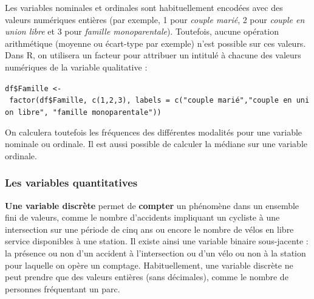 \documentclass[
  11pt,
  french,
]{book}
\makeatletter
\newenvironment{kframev}{%
\medskip{}
\setlength{\fboxsep}{.8em}
 \def\at@end@of@kframev{}%
 \ifinner\ifhmode%
  \def\at@end@of@kframev{\end{minipage}}%
  \begin{minipage}{\columnwidth}%
 \fi\fi%
 \def\FrameCommand##1{\hskip\@totalleftmargin \hskip-\fboxsep
 \colorbox{shadebluecolor}{##1}\hskip-\fboxsep
     \hskip-\linewidth \hskip-\@totalleftmargin \hskip\columnwidth}%
 \MakeFramed {\advance\hsize-\width
   \@totalleftmargin\z@ \linewidth\hsize
   \@setminipage}}%
 {\par\unskip\endMakeFramed%
 \at@end@of@kframev}
\newenvironment{rmdblock}[1]
  {
  \begin{itemize}
  \renewcommand{\labelitemi}{
    \raisebox{-.7\height}[0pt][0pt]{
      {\setkeys{Gin}{width=3em,keepaspectratio}\texttt{[image: images/\#1]}}
    }
  }
  \setlength{\fboxsep}{1em}
  \begin{kframev}
  \small
  \item
  }
  {
  \end{kframev}
  \end{itemize}
  }
\newenvironment{bloc_attention}
  {\begin{rmdblock}{attention}}
  {\end{rmdblock}}
\makeatother
\begin{document}
\begin{bloc_attention}

Les variables nominales et ordinales sont habituellement encodées avec des valeurs numériques entières (par exemple, 1 pour \emph{couple marié}, 2 pour \emph{couple en union libre} et 3 pour \emph{famille monoparentale}). Toutefois, aucune opération arithmétique (moyenne ou écart-type par exemple) n'est possible sur ces valeurs. Dans R, on utilisera un facteur pour attribuer un intitulé à chacune des valeurs numériques de la variable qualitative :

\texttt{df\$Famille\ \textless{}-\ factor(df\$Famille,\ c(1,2,3),\ labels\ =\ c("couple\ marié","couple\ en\ union\ libre",\ "famille\ monoparentale"))}

On calculera toutefois les fréquences des différentes modalités pour une variable nominale ou ordinale. Il est aussi possible de calculer la médiane sur une variable ordinale.

\end{bloc_attention}

\hypertarget{sect02122}{%
\subsubsection{Les variables quantitatives}\label{sect02122}}

\textbf{Une variable discrète} permet de \textbf{compter} un phénomène dans un ensemble fini de valeurs, comme le nombre d'accidents impliquant un cycliste à une intersection sur une période de cinq ans ou encore le nombre de vélos en libre service disponibles à une station. Il existe ainsi une variable binaire sous-jacente : la présence ou non d'un accident à l'intersection ou d'un vélo ou non à la station pour laquelle on opère un comptage. Habituellement, une variable discrète ne peut prendre que des valeurs entières (sans décimales), comme le nombre de personnes fréquentant un parc.
\end{document}
